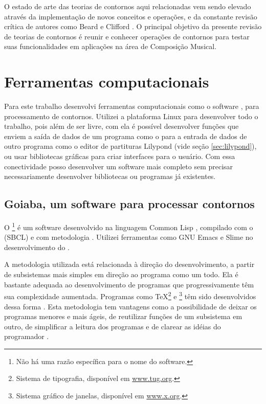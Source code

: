 O estado de arte das teorias de contornos aqui relacionadas vem sendo
elevado através da implementação de novos conceitos e operações, e da
constante revisão crítica de autores como Beard e Clifford
\cite{beard03:contour,clifford95:contour}. O principal objetivo da
presente revisão de teorias de contornos é reunir e conhecer operações
de contornos para testar suas funcionalidades em aplicações na área de
Composição Musical.

\chapter{Ferramentas computacionais}
\label{cha:ferramentas}

Para este trabalho desenvolvi ferramentas computacionais como o
software \goiaba{}, para processamento de contornos. Utilizei a
plataforma Linux para desenvolver todo o trabalho, pois além de ser
livre, com ela é possível desenvolver funções que enviem a saída de
dados de um programa como o \goiaba{} para a entrada de dados de outro
programa como
o editor de partituras Lilypond (vide seção \ref{sec:lilypond}), ou
usar bibliotecas gráficas para criar interfaces para o usuário. Com
essa conectividade posso desenvolver um software mais completo sem
precisar necessariamente desenvolver bibliotecas ou programas já
existentes.

\section{Goiaba, um software para processar contornos}
\label{sec:goiaba-software-para}

O \goiaba{}\footnote{Não há uma razão específica para o nome do
  software.}  é um software desenvolvido na linguagem Common Lisp
\cite{graham94:lisp,seibel05:practical,shapiro92:common}, compilado
com o  (SBCL) \cite{team07:sbcl} e com
metodologia . Utilizei ferramentas como GNU Emacs
\cite{stallman07:gnu} e Slime \cite{team05:slime} no desenvolvimento
do \goiaba{}.

A metodologia  utilizada está relacionada à direção do
desenvolvimento, a partir de subsistemas mais simples em direção ao
programa como um todo. Ela é bastante adequada ao desenvolvimento de
programas que progressivamente têm sua complexidade
aumentada. Programas como \TeX{}\footnote{Sistema de tipografia,
  disponível em \url{www.tug.org}.} e \footnote{Sistema gráfico de janelas, disponível em
  \url{www.x.org}.} têm sido desenvolvidos dessa forma
\cite[p. vi]{graham94:lisp}. Esta metodologia tem vantagens como a
possibilidade de deixar os programas menores e mais ágeis, de
reutilizar funções de um subsistema em outro, de simplificar a leitura
dos programas e de clarear as idéias do programador
\cite[p. 4]{graham94:lisp}.

